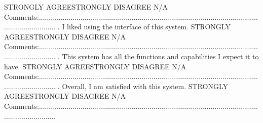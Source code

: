 STRONGLY AGREE\tab\tab\tab\tab\tab STRONGLY DISAGREE
\newline\newline
{}\tab\tab N/A
\newline\newline
Comments:.........................................................................................................................................
\newline{}. I liked using the interface of this system.
\newline\newline
STRONGLY AGREE\tab\tab\tab\tab\tab STRONGLY DISAGREE
\newline\newline
{}\tab\tab N/A
\newline\newline
Comments:.........................................................................................................................................
\newline{}. This system has all the functions and capabilities I expect it to have.
\newline\newline
STRONGLY AGREE\tab\tab\tab\tab\tab STRONGLY DISAGREE
\newline\newline
{}\tab\tab N/A
\newline\newline
Comments:.........................................................................................................................................
\newline{}. Overall, I am satisfied with this system.
\newline\newline
STRONGLY AGREE\tab\tab\tab\tab\tab STRONGLY DISAGREE
\newline\newline
{}\tab\tab N/A
\newline\newline
Comments:.........................................................................................................................................
\newline\newline
\newpage
\appendix

